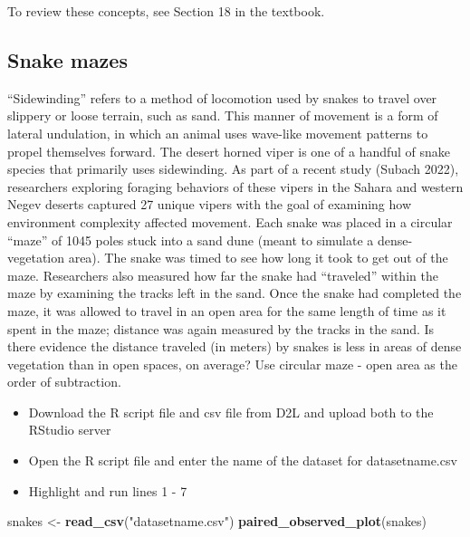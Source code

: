 \documentclass[
]{report}
\newenvironment{Shaded}{\begin{snugshade}}{\end{snugshade}}
\newcommand{\FunctionTok}[1]{\textcolor[rgb]{0.13,0.29,0.53}{\textbf{#1}}}
\newcommand{\NormalTok}[1]{#1}
\newcommand{\OtherTok}[1]{\textcolor[rgb]{0.56,0.35,0.01}{#1}}
\newcommand{\StringTok}[1]{\textcolor[rgb]{0.31,0.60,0.02}{#1}}
\begin{document}
To review these concepts, see Section 18 in the textbook.

\subsection{Snake mazes}\label{snake-mazes}

``Sidewinding'' refers to a method of locomotion used by snakes to travel over slippery or loose terrain, such as sand. This manner of movement is a form of lateral undulation, in which an animal uses wave-like movement patterns to propel themselves forward. The desert horned viper is one of a handful of snake species that primarily uses sidewinding. As part of a recent study (Subach 2022), researchers exploring foraging behaviors of these vipers in the Sahara and western Negev deserts captured 27 unique vipers with the goal of examining how environment complexity affected movement. Each snake was placed in a circular ``maze'' of 1045 poles stuck into a sand dune (meant to simulate a dense-vegetation area). The snake was timed to see how long it took to get out of the maze. Researchers also measured how far the snake had ``traveled'' within the maze by examining the tracks left in the sand. Once the snake had completed the maze, it was allowed to travel in an open area for the same length of time as it spent in the maze; distance was again measured by the tracks in the sand. Is there evidence the distance traveled (in meters) by snakes is less in areas of dense vegetation than in open spaces, on average? Use circular maze - open area as the order of subtraction.

\begin{itemize}
\item
  Download the R script file and csv file from D2L and upload both to the RStudio server
\item
  Open the R script file and enter the name of the dataset for datasetname.csv
\item
  Highlight and run lines 1 - 7
\end{itemize}

\begin{Shaded}
\begin{Highlighting}[]
\NormalTok{snakes }\OtherTok{\textless{}{-}} \FunctionTok{read\_csv}\NormalTok{(}\StringTok{"datasetname.csv"}\NormalTok{)}
\FunctionTok{paired\_observed\_plot}\NormalTok{(snakes)}
\end{Highlighting}
\end{Shaded}
\end{document}
